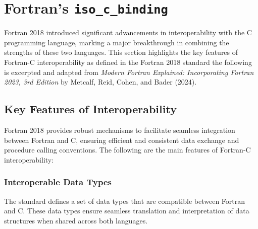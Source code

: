 % 

\section{Fortran's \texttt{iso\_c\_binding}}
Fortran 2018 introduced significant advancements in interoperability with the C programming language, marking a major breakthrough in combining the strengths of these two languages. This section highlights the key features of Fortran-C interoperability as defined in the Fortran 2018 standard the following is excerpted and adapted from \emph{Modern Fortran Explained: Incorporating Fortran 2023, 3rd Edition} by Metcalf, Reid, Cohen, and Bader (2024).

\subsection{Key Features of Interoperability}

Fortran 2018 provides robust mechanisms to facilitate seamless integration between Fortran and C, ensuring efficient and consistent data exchange and procedure calling conventions. The following are the main features of Fortran-C interoperability:

\subsubsection{Interoperable Data Types}
The standard defines a set of data types that are compatible between Fortran and C. These data types ensure seamless translation and interpretation of data structures when shared across both languages.


